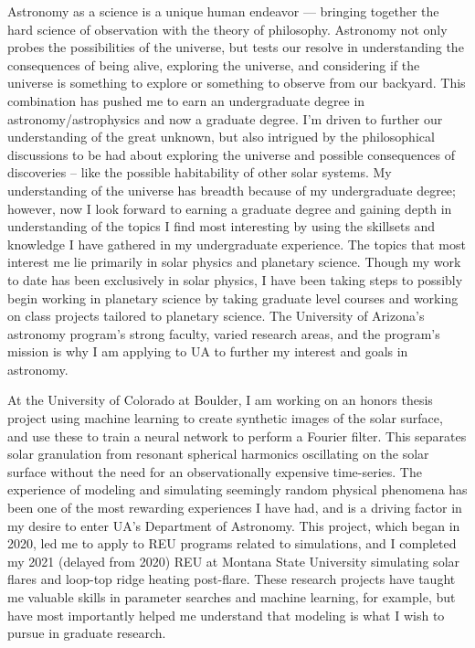 \documentclass[11pt,letterpaper]{article}
\begin{document}
Astronomy as a science is a unique human endeavor — bringing together the hard science of observation with the theory of philosophy. Astronomy not only probes the possibilities of the universe, but tests our resolve in understanding the consequences of being alive, exploring the universe, and considering if the universe is something to explore or something to observe from our backyard. This combination has pushed me to earn an undergraduate degree in astronomy/astrophysics and now a graduate degree. I’m driven to further our understanding of the great unknown, but also intrigued by the philosophical discussions to be had about exploring the universe and possible consequences of discoveries -- like the possible habitability of other solar systems. My understanding of the universe has breadth because of my undergraduate degree; however, now I look forward to earning a graduate degree and gaining depth in understanding of the topics I find most interesting by using the skillsets and knowledge I have gathered in my undergraduate experience. The topics that most interest me lie primarily in solar physics and planetary science. Though my work to date has been exclusively in solar physics, I have been taking steps to possibly begin working in planetary science by taking graduate level courses and working on class projects tailored to planetary science. The University of Arizona's astronomy program's strong faculty, varied research areas, and the program's mission is why I am applying to UA to further my interest and  goals in astronomy.

At the University of Colorado at Boulder, I am working on an honors thesis project using machine learning to create synthetic images of the solar surface, and use these to train a neural network to perform a Fourier filter. This separates solar granulation from resonant spherical harmonics oscillating on the solar surface without the need for an observationally expensive time-series. The experience of modeling and simulating seemingly random physical phenomena has been one of the most rewarding experiences I have had, and is a driving factor in my desire to enter UA's Department of Astronomy. This project, which began in 2020, led me to apply to REU programs related to simulations, and I completed my 2021 (delayed from 2020) REU at Montana State University simulating solar flares and loop-top ridge heating post-flare. These research projects have taught me valuable skills in parameter searches and machine learning, for example, but have most importantly helped me understand that modeling is what I wish to pursue in graduate research.
 
\end{document}
